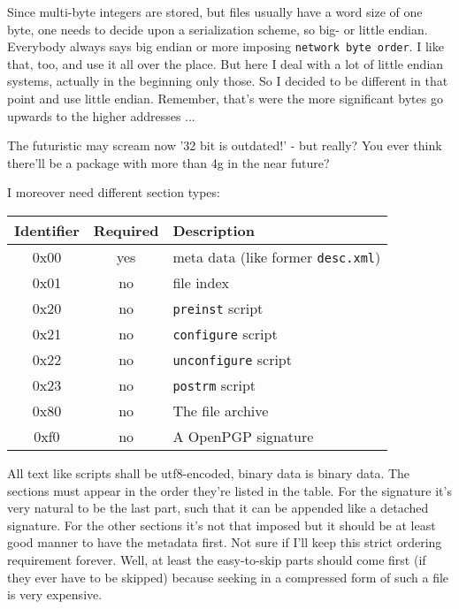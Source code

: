 \documentclass[a4paper]{scrartcl}
\newcommand{\file}[1]{\texttt{#1}}
\newcommand{\script}[1]{\texttt{#1}}
\begin{document}
	Since multi-byte integers are stored, but files usually have a word size of one byte, one needs to decide upon a serialization scheme, so big- or little endian. Everybody always says big endian or more imposing \texttt{network byte order}. I like that, too, and use it all over the place. But here I deal with a lot of little endian systems, actually in the beginning only those. So I decided to be different in that point and use little endian. Remember, that's were the more significant bytes go upwards to the higher addresses ...
	
	The futuristic may scream now '32 bit is outdated!' - but really? You ever think there'll be a package with more than 4g in the near future?

	
	\vspace{1eM}	
	I moreover need different section types:
	
	\vspace{1em}

	\begin{tabularx}{\textwidth}{c|c|X}
		Identifier & Required & Description \\
		\hline
		0x00 & yes & meta data (like former \file{desc.xml}) \\
		0x01 & no & file index \\
		0x20 & no & \script{preinst} script \\
		0x21 & no & \script{configure} script \\
		0x22 & no & \script{unconfigure} script \\
		0x23 & no & \script{postrm} script \\
		0x80 & no & The file archive \\
		0xf0 & no & A OpenPGP signature \\
	\end{tabularx}

	\vspace{1eM}
	
	All text like scripts shall be utf8-encoded, binary data is binary data. The sections must appear in the order they're listed in the table. For the signature it's very natural to be the last part, such that it can be appended like a detached signature. For the other sections it's not that imposed but it should be at least good manner to have the metadata first. Not sure if I'll keep this strict ordering requirement forever. Well, at least the easy-to-skip parts should come first (if they ever have to be skipped) because seeking in a compressed form of such a file is very expensive.
	
\end{document}

